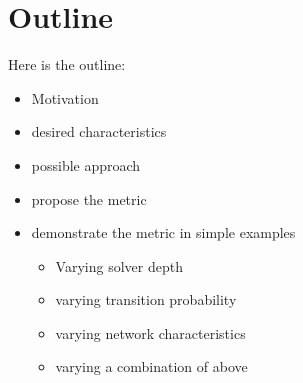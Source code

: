 \section{Outline}
Here is the outline:

\begin{itemize}
    \item Motivation
    \item desired characteristics
    \item possible approach
    \item propose the metric
    \item demonstrate the metric in simple examples
    \begin{itemize}
        \item Varying solver depth
        \item varying transition probability
        \item varying network characteristics
        \item varying a combination of above
    \end{itemize}
\end{itemize}
